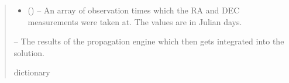 \documentclass[letterpaper,11pt,english]{sphinxmanual}
\begin{document}
\begin{savenotes}
\begin{fulllineitems}
\begin{quote}
\begin{description}
\begin{itemize}
\item {} 
\sphinxAtStartPar
{} () – An array of observation times which the RA and DEC measurements
were taken at. The values are in Julian days.

\end{itemize}

\sphinxAtStartPar
{} – The results of the propagation engine which then gets integrated into
the solution.

\sphinxAtStartPar
dictionary

\end{description}\end{quote}

\end{fulllineitems}\end{savenotes}

\end{document}
